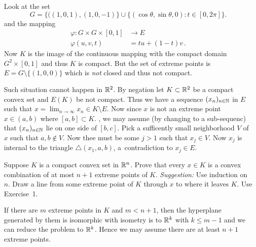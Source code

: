 \begin{enumerate}
Look at the set
\begin{equation*}
G = \{((1,0,1), (1,0,-1)\} \cup
    \{(\cos \theta, \sin \theta, 0): t \in [0,2\pi]\}.
\end{equation*}
and the mapping
\begin{align*}
\varphi: G \times G \times [0,1] &\to E \\
\varphi(u,v,t) &= tu + (1-t)v\,.
\end{align*}
Now $K$ is the image of the continuous mapping with the compact domain
 \(G^2\times [0,1]\) and thus $K$ is compact.
But the set of extreme points is \(E = G \setminus \{(1, 0, 0)\}\)
which is \emph{not} closed and thus not compact.

Such situation cannot happen in \(\mathbb{R}^2\). By negation let \(K\subset \mathbb{R}^2\)
be a compact convex set and \(E(K)\) be not compact.
Thus we have a sequence \((x_n)_{n\in\mathbb{N}}\) in $E$ such that
\(x = \lim_{n\to\infty} x_n \in K\setminus E\).
Now since $x$ is not an extreme point \(x \in (a,b)\) where \([a,b]\subset K\).
\Wlogy, we may assume (by changing to a sub-sequenc) that 
\((x_n)_{n\in\mathbb{N}}\) lie on one side of \([b,c]\).
Pick a sufficently small neighborhood $V$ of $x$ such that \(a,b\notin V\).
Now thee must be some \(j>1\) such that \(x_j \in V\).
Now \(x_j\) is internal to the triangle \(\triangle(x_1,a,b)\),
a~contradiction to \(x_j \in E\).


\begin{excopy}
Suppose $K$ is a compact convex set in \(\mathbb{R}^n\). Prove that every \(x\in K\)
is a convex combination of at most \(n+1\) extreme points of $K$.
\emph{Suggestion:} Use induction on $n$. Draw a line from some extreme point
of $K$ through $x$ to where it leaves $K$. Use Exercise~1.
\end{excopy}

If there are $m$ extreme points in $K$ and
\(m < n+1\), then the hyperplane
generated by them is isomorphic with isometry is to \(\mathbb{R}^k\)
with \(k \leq m-1\) and we can reduce the problem to \(\mathbb{R}^k\).
Hence we may assume there are at least \(n+1\) extreme points.

\iffalse
If \(b \in \partial K\) is a non-extreme boundary point of $K$, define its
\emph{face} \(F_b\) by
\begin{equation*}
F_b = \{tv + (1-t)w:
   v,w\in K \wedge 0\leq t \leq 1 \wedge\;
   \exists \tau \in(0,1),\, b = \tau v + (1-\tau)u\}.
\end{equation*}

We want to show that \(F_b\) is comact, convex and lies with a hyperplane
of dimension less that that of $K$.
\fi


\end{enumerate}
